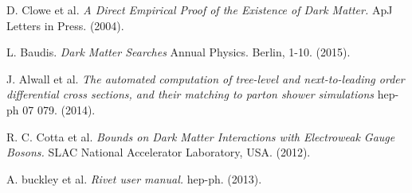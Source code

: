 \begin{thebibliography}{9}
D. Clowe et al.
\textit{A Direct Empirical Proof of the Existence of Dark Matter.}
ApJ Letters in Press. (2004).

L. Baudis.
\textit{Dark Matter Searches}
Annual Physics. Berlin, 1-10. (2015).

J. Alwall et al.
\textit{The automated computation of tree-level and next-to-leading order differential cross sections, and their matching to parton shower simulations}
hep-ph 07 079. (2014).

R. C. Cotta et al.
\textit{Bounds on Dark Matter Interactions with Electroweak Gauge Bosons.}
SLAC National Accelerator Laboratory, USA. (2012).

A. buckley et al. 
\textit{Rivet user manual.}
hep-ph. (2013).

\end{thebibliography}
